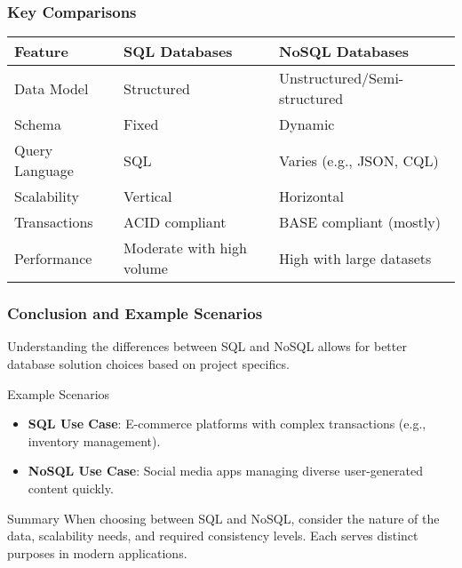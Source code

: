 \documentclass[aspectratio=169]{beamer}
\begin{document}
\begin{frame}[fragile]
    \frametitle{Key Comparisons}
    \begin{table}[h]
        \centering
        \begin{tabular}{|l|l|l|}
            \hline
            Feature                   & SQL Databases                & NoSQL Databases            \\ \hline
            Data Model                & Structured                   & Unstructured/Semi-structured \\ \hline
            Schema                    & Fixed                        & Dynamic                   \\ \hline
            Query Language            & SQL                          & Varies (e.g., JSON, CQL) \\ \hline
            Scalability               & Vertical                     & Horizontal                \\ \hline
            Transactions              & ACID compliant              & BASE compliant (mostly)   \\ \hline
            Performance               & Moderate with high volume    & High with large datasets   \\ \hline
        \end{tabular}
    \end{table}
\end{frame}

\begin{frame}[fragile]
    \frametitle{Conclusion and Example Scenarios}
    Understanding the differences between SQL and NoSQL allows for better database solution choices based on project specifics. 

    \begin{block}{Example Scenarios}
        \begin{itemize}
            \item \textbf{SQL Use Case}: E-commerce platforms with complex transactions (e.g., inventory management).
            \item \textbf{NoSQL Use Case}: Social media apps managing diverse user-generated content quickly.
        \end{itemize}
    \end{block}

    \begin{block}{Summary}
        When choosing between SQL and NoSQL, consider the nature of the data, scalability needs, and required consistency levels. Each serves distinct purposes in modern applications.
    \end{block}
\end{frame}
\end{document}
